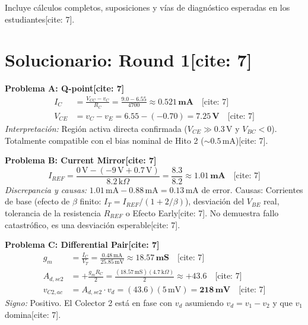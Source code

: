 \documentclass[11pt, a4paper]{article}
\begin{document}
\begin{tcolorbox}[colback=red!5, colframe=red!70!black, title=\textbf{Material Reservado Docente: Soluciones Explícitas Práctica Individual}]
    Incluye cálculos completos, suposiciones y vías de diagnóstico esperadas en los estudiantes[cite: 7].
\end{tcolorbox}

\section*{Solucionario: Round 1[cite: 7]}

\textbf{Problema A: Q-point[cite: 7]}
\begin{align*}
    I_C &= \frac{V_{CC} - v_C}{R_C} = \frac{9.0 - 6.55}{4700} \approx \mathbf{0.521\,\text{mA}} \quad \text{[cite: 7]} \\
    V_{CE} &= v_C - v_E = 6.55 - (-0.70) = \mathbf{7.25\,\text{V}} \quad \text{[cite: 7]}
\end{align*}
\textit{Interpretación:} Región activa directa confirmada ($V_{CE} \gg 0.3\,\text{V}$ y $V_{BC} < 0$). Totalmente compatible con el bias nominal de Hito 2 ($\sim 0.5\,\text{mA}$)[cite: 7].

\vspace{0.2cm}
\textbf{Problema B: Current Mirror[cite: 7]}
\begin{equation*}
    I_{REF} = \frac{0\,\text{V} - (-9\,\text{V} + 0.7\,\text{V})}{8.2\,\text{k}\Omega} = \frac{8.3}{8.2} \approx \mathbf{1.01\,\text{mA}} \quad \text{[cite: 7]}
\end{equation*}
\textit{Discrepancia y causas:} $1.01\,\text{mA} - 0.88\,\text{mA} = 0.13\,\text{mA}$ de error. Causas: Corrientes de base (efecto de $\beta$ finito: $I_T = I_{REF}/(1+2/\beta)$), desviación del $V_{BE}$ real, tolerancia de la resistencia $R_{REF}$ o Efecto Early[cite: 7]. No demuestra fallo catastrófico, es una desviación esperable[cite: 7].

\vspace{0.2cm}
\textbf{Problema C: Differential Pair[cite: 7]}
\begin{align*}
    g_m &= \frac{I_C}{V_T} = \frac{0.48\,\text{mA}}{25.85\,\text{mV}} \approx \mathbf{18.57\,\text{mS}} \quad \text{[cite: 7]} \\
    A_{d,se2} &= +\frac{g_m R_C}{2} = \frac{(18.57\,\text{mS})(4.7\,\text{k}\Omega)}{2} \approx \mathbf{+43.6} \quad \text{[cite: 7]} \\
    v_{C2,ac} &= A_{d,se2} \cdot v_d = (43.6)(5\,\text{mV}) = \mathbf{218\,\text{mV}} \quad \text{[cite: 7]}
\end{align*}
\textit{Signo:} Positivo. El Colector 2 está en fase con $v_d$ asumiendo $v_d = v_1 - v_2$ y que $v_1$ domina[cite: 7].
\end{document}
